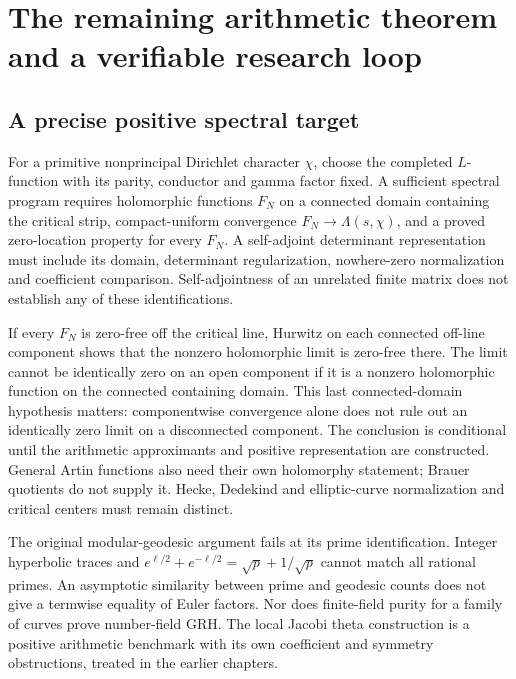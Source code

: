 \documentclass[11pt,oneside,openany]{book}
\theoremstyle{definition}\newtheorem{definition}[theorem]{Definition}
\theoremstyle{remark}\newtheorem{remark}[theorem]{Remark}
\begin{document}
\chapter{The remaining arithmetic theorem and a verifiable research loop}
\label{book:frontier}
\section{A precise positive spectral target}
For a primitive nonprincipal Dirichlet character $\chi$, choose the completed $L$-function with its parity, conductor and gamma factor fixed. A sufficient spectral program requires holomorphic functions $F_N$ on a connected domain containing the critical strip, compact-uniform convergence $F_N\to\Lambda(s,\chi)$, and a proved zero-location property for every $F_N$. A self-adjoint determinant representation must include its domain, determinant regularization, nowhere-zero normalization and coefficient comparison. Self-adjointness of an unrelated finite matrix does not establish any of these identifications.

If every $F_N$ is zero-free off the critical line, Hurwitz on each connected off-line component shows that the nonzero holomorphic limit is zero-free there. The limit cannot be identically zero on an open component if it is a nonzero holomorphic function on the connected containing domain. This last connected-domain hypothesis matters: componentwise convergence alone does not rule out an identically zero limit on a disconnected component. The conclusion is conditional until the arithmetic approximants and positive representation are constructed. General Artin functions also need their own holomorphy statement; Brauer quotients do not supply it. Hecke, Dedekind and elliptic-curve normalization and critical centers must remain distinct.

The original modular-geodesic argument fails at its prime identification. Integer hyperbolic traces and $e^{\ell/2}+e^{-\ell/2}=\sqrt p+1/\sqrt p$ cannot match all rational primes. An asymptotic similarity between prime and geodesic counts does not give a termwise equality of Euler factors. Nor does finite-field purity for a family of curves prove number-field GRH. The local Jacobi theta construction is a positive arithmetic benchmark with its own coefficient and symmetry obstructions, treated in the earlier chapters.
\end{document}

